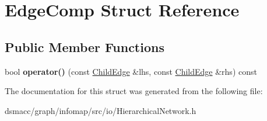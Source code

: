 \hypertarget{structEdgeComp}{}\section{Edge\+Comp Struct Reference}
\label{structEdgeComp}
\subsection*{Public Member Functions}
\begin{DoxyCompactItemize}
\item 
\mbox{\label{structEdgeComp_a9b5dac7cc63493bf3c96ab19d241f416}} 
bool {\bfseries operator()} (const \mbox{\hyperlink{structChildEdge}{Child\+Edge}} \&lhs, const \mbox{\hyperlink{structChildEdge}{Child\+Edge}} \&rhs) const
\end{DoxyCompactItemize}


The documentation for this struct was generated from the following file\+:\begin{DoxyCompactItemize}
\item 
dsmacc/graph/infomap/src/io/Hierarchical\+Network.\+h\end{DoxyCompactItemize}
